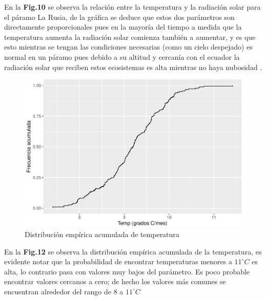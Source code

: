 \documentclass[conference,final,]{IEEEtran}
\makeatletter
\def\maxwidth{\ifdim\Gin@nat@width>\linewidth\linewidth
\else\Gin@nat@width\fi}
\let\Oldincludegraphics\includegraphics
\renewcommand{\includegraphics}[1]{\Oldincludegraphics[width=\maxwidth]{#1}}
\makeatother
\begin{document}
En la \textbf{Fig.10} se observa la relación entre la temperatura y la
radiación solar para el páramo La Rusia, de la gráfica se deduce que
estos dos parámetros son directamente proporcionales pues en la mayoría
del tiempo a medida que la temperatura aumenta la radiación solar
comienza también a aumentar, y es que esto mientras se tengan las
condiciones necesarias (como un cielo despejado) es normal en un páramo
pues debido a su altitud y cercanía con el ecuador la radiación solar
que reciben estos ecosistemas es alta mientras no haya nubosidad
\cite{montenegro2015estimacion}.

\begin{figure}
\centering
\includegraphics{Hidrology_files/figure-latex/unnamed-chunk-23-1.pdf}
\caption{Distribución empírica acumulada de temperatura}
\end{figure}

En la \textbf{Fig.12} se observa la distribución empírica acumulada de
la temperatura, es evidente notar que la probabilidad de encontrar
temperaturas menores a \(11^{\circ}C\) es alta, lo contrario pasa con
valores muy bajos del parámetro. Es poco probable encontrar valores
cercanos a cero; de hecho los valores más comunes se encuentran
alrededor del rango de \(8\) a \(11^{\circ}C\)
\end{document}
